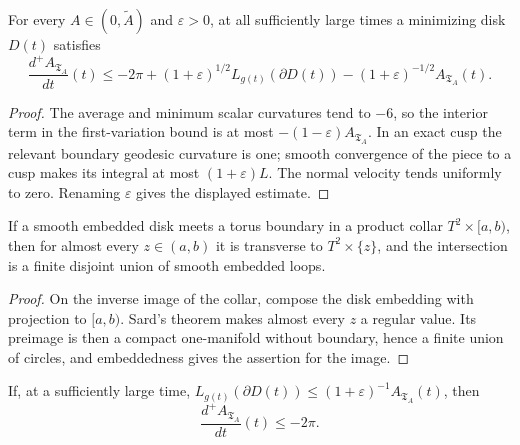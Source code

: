 \begin{lemma}
\label{lem:chow-iv-minimizing-disk-evolution}


For every \(A\in(0,\widetilde A)\) and \(\varepsilon>0\), at all sufficiently
large times a minimizing disk \(D(t)\) satisfies
\[
 \frac{d^+A_{\mathfrak T_A}}{dt}(t)\le-2\pi
 +(1+\varepsilon)^{1/2}L_{g(t)}(\partial D(t))
 -(1+\varepsilon)^{-1/2}A_{\mathfrak T_A}(t).
\]
\end{lemma}

\begin{proof}
\sketch
The average and minimum scalar curvatures tend to \(-6\), so the interior term
in the first-variation bound is at most
\(-(1-\varepsilon)A_{\mathfrak T_A}\).  In an exact cusp the relevant boundary
geodesic curvature is one; smooth convergence of the piece to a cusp makes its
integral at most \((1+\varepsilon)L\).  The normal velocity tends uniformly to
zero.  Renaming \(\varepsilon\) gives the displayed estimate.
\end{proof}

\begin{lemma}
\label{lem:chow-iv-disk-torus-slice-transversality}

If a smooth embedded disk meets a torus boundary in a product collar
\(T^2\times[a,b)\), then for almost every \(z\in(a,b)\) it is transverse to
\(T^2\times\{z\}\), and the intersection is a finite disjoint union of smooth
embedded loops.
\end{lemma}

\begin{proof}
\sketch
On the inverse image of the collar, compose the disk embedding with projection
to \([a,b)\).  Sard's theorem makes almost every \(z\) a regular value.  Its
preimage is then a compact one-manifold without boundary, hence a finite union
of circles, and embeddedness gives the assertion for the image.
\end{proof}

\begin{lemma}
\label{lem:chow-iv-area-decay-short-boundary}


If, at a sufficiently large time,
\(L_{g(t)}(\partial D(t))\le(1+\varepsilon)^{-1}A_{\mathfrak T_A}(t)\), then
\[
 \frac{d^+A_{\mathfrak T_A}}{dt}(t)\le-2\pi.
\]
\end{lemma}


